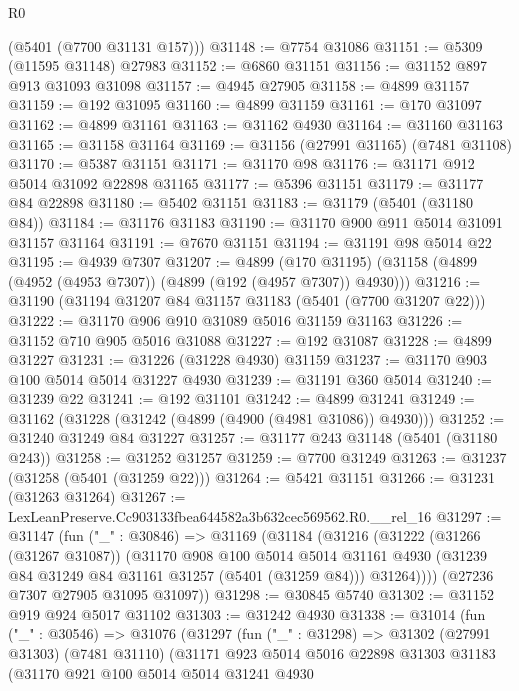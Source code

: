 \begin{lexlean}{R0}
\begin{coremodule}
      (@5401 (@7700 @31131 @157)))
@31148 := @7754 @31086
@31151 := @5309 (@11595 @31148) @27983
@31152 := @6860 @31151
@31156 := @31152 @897 @913 @31093 @31098
@31157 := @4945 @27905
@31158 := @4899 @31157
@31159 := @192 @31095
@31160 := @4899 @31159
@31161 := @170 @31097
@31162 := @4899 @31161
@31163 := @31162 @4930
@31164 := @31160 @31163
@31165 := @31158 @31164
@31169 := @31156 (@27991 @31165) (@7481 @31108)
@31170 := @5387 @31151
@31171 := @31170 @98
@31176 := @31171 @912 @5014 @31092 @22898 @31165
@31177 := @5396 @31151
@31179 := @31177 @84 @22898
@31180 := @5402 @31151
@31183 := @31179 (@5401 (@31180 @84))
@31184 := @31176 @31183
@31190 := @31170 @900 @911 @5014 @31091 @31157 @31164
@31191 := @7670 @31151
@31194 := @31191 @98 @5014 @22
@31195 := @4939 @7307
@31207 := @4899
    (@170 @31195)
    (@31158 (@4899 (@4952 (@4953 @7307)) (@4899 (@192 (@4957 @7307)) @4930)))
@31216 := @31190 (@31194 @31207 @84 @31157 @31183 (@5401 (@7700 @31207 @22)))
@31222 := @31170 @906 @910 @31089 @5016 @31159 @31163
@31226 := @31152 @710 @905 @5016 @31088
@31227 := @192 @31087
@31228 := @4899 @31227
@31231 := @31226 (@31228 @4930) @31159
@31237 := @31170 @903 @100 @5014 @5014 @31227 @4930
@31239 := @31191 @360 @5014
@31240 := @31239 @22
@31241 := @192 @31101
@31242 := @4899 @31241
@31249 := @31162 (@31228 (@31242 (@4899 (@4900 (@4981 @31086)) @4930)))
@31252 := @31240 @31249 @84 @31227
@31257 := @31177 @243 @31148 (@5401 (@31180 @243))
@31258 := @31252 @31257
@31259 := @7700 @31249
@31263 := @31237 (@31258 (@5401 (@31259 @22)))
@31264 := @5421 @31151
@31266 := @31231 (@31263 @31264)
@31267 := LexLeanPreserve.Cc903133fbea644582a3b632cec569562.R0.__rel_16
@31297 := @31147
    (fun ("_" : @30846) =>
    @31169
      (@31184
        (@31216
          (@31222
            (@31266 (@31267 @31087))
            (@31170
              @908
              @100
              @5014
              @5014
              @31161
              @4930
              (@31239 @84 @31249 @84 @31161 @31257 (@5401 (@31259 @84)))
              @31264))))
      (@27236 @7307 @27905 @31095 @31097))
@31298 := @30845 @5740
@31302 := @31152 @919 @924 @5017 @31102
@31303 := @31242 @4930
@31338 := @31014
    (fun ("_" : @30546) =>
    @31076
      (@31297
        (fun ("_" : @31298) =>
        @31302
          (@27991 @31303)
          (@7481 @31110)
          (@31171
            @923
            @5014
            @5016
            @22898
            @31303
            @31183
            (@31170
              @921
              @100
              @5014
              @5014
              @31241
              @4930

\end{coremodule}
\end{lexlean}
